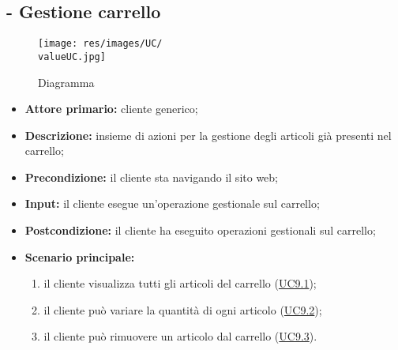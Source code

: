 \subsection{ - Gestione carrello}
\begin{figure}[H]
    \centering
    \texttt{[image: res/images/UC/\\valueUC.jpg]}
    \caption{Diagramma }
\end{figure}
\begin{itemize}
    \item \textbf{Attore primario:} cliente generico;
    \item \textbf{Descrizione:} insieme di azioni per la gestione degli articoli già presenti nel carrello;
    \item \textbf{Precondizione:} il cliente sta navigando il sito web;
    \item \textbf{Input:} il cliente esegue un'operazione gestionale sul carrello;
    \item \textbf{Postcondizione:} il cliente ha eseguito operazioni gestionali sul carrello;
    \item \textbf{Scenario principale:}
          \begin{enumerate}
              \item il cliente visualizza tutti gli articoli del carrello (\hyperref[UC9.1]{UC9.1});
              \item il cliente può variare la quantità di ogni articolo (\hyperref[UC9.2]{UC9.2});
              \item il cliente può rimuovere un articolo dal carrello (\hyperref[UC9.3]{UC9.3}).
          \end{enumerate}
    
\end{itemize}

\stepsubUserCase
